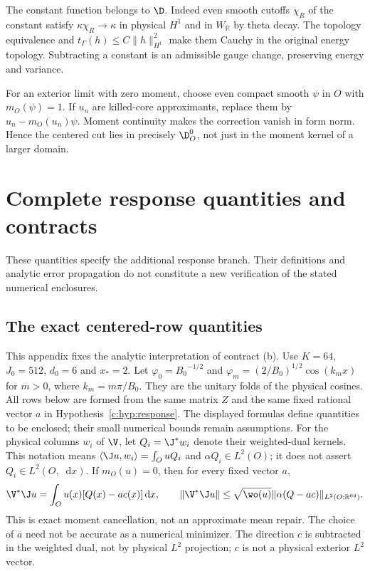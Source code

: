 \documentclass[11pt,a4paper]{article}
\numberwithin{equation}{section}
\theoremstyle{definition}\newtheorem{definition}[theorem]{Definition}
\theoremstyle{remark}\newtheorem{remark}[theorem]{Remark}
\newcommand{\R}{\mathbb R}\newcommand{\C}{\mathbb C}\newcommand{\N}{\mathbb N}
\newcommand{\ip}[2]{\langle#1,#2\rangle}\newcommand{\norm}[1]{\lVert#1\rVert}\newcommand{\abs}[1]{\lvert#1\rvert}
\newcommand{\dd}{\mathop{}\!\mathrm d}\newcommand{\one}{\mathbf1}
\begin{document}
The constant function belongs to $\D$. Indeed even smooth cutoffs
$\chi_R$ of the constant satisfy $\kappa\chi_R\to\kappa$ in physical
$H^1$ and in $W_\R$ by theta decay. The topology equivalence and
$t_\Gamma(h)\le C\norm h_{H^1}^2$ make them Cauchy in the original
energy topology. Subtracting a constant is an admissible gauge change,
preserving energy and variance.

For an exterior limit with zero moment, choose even compact smooth
$\psi$ in $O$ with $m_O(\psi)=1$. If $u_n$ are killed-core approximants,
replace them by $u_n-m_O(u_n)\psi$. Moment continuity makes the
correction vanish in form norm. Hence the centered cut lies in
precisely $\D_O^0$, not just in the moment kernel of a larger domain.


\section{Complete response quantities and contracts}\label{app:response}
These quantities specify the additional response branch. Their definitions and analytic error propagation do not constitute a new verification of the stated numerical enclosures.


\subsection{The exact centered-row quantities}\label{c:app:rows}
This appendix fixes the analytic interpretation of contract (b).
Use $K=64$, $J_0=512$, $d_0=6$ and $x_*=2$.
Let $\varphi_0={B_0}^{-1/2}$ and
$\varphi_m=(2/{B_0})^{1/2}\cos(k_mx)$ for $m>0$, where $k_m=m\pi/{B_0}$.
They are the unitary folds of the physical cosines.
All rows below are formed from the same matrix $Z$ and the same fixed rational vector $a$ in Hypothesis~\ref{c:hyp:response}.
The displayed formulas define quantities to be enclosed; their small numerical bounds remain assumptions.
For the physical columns $w_i$ of $\V$, let $Q_i=\J^*w_i$ denote
their weighted-dual kernels. This notation means
$\ip{\J u}{w_i}=\int_OuQ_i$ and
$\alpha Q_i\in L^2(O)$; it does not assert $Q_i\in L^2(O,\dd x)$.
If $m_O(u)=0$, then for every fixed vector $a$,
\begin{equation}\label{c:eq:centering}
 \V^*\J u=\int_Ou(x)[Q(x)-ac(x)]\dd x,\qquad
 \norm{\V^*\J u}\le\sqrt{\wo(u)}\norm{\alpha(Q-ac)}_{L^2(O;\R^{64})}.
\end{equation}
This is exact moment cancellation, not an approximate mean repair.
The choice of $a$ need not be accurate as a numerical minimizer.
The direction $c$ is subtracted in the weighted dual, not by physical
$L^2$ projection; $c$ is not a physical exterior $L^2$ vector.
\end{document}
